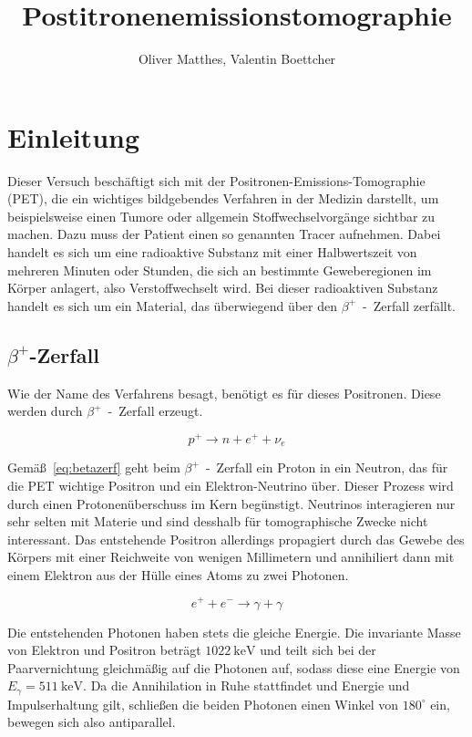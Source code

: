 \documentclass[slug=PET, room=Andreas-Schubert-Bau\,\ 424A,
supervisor=Carsten\ Bittrich, coursedate=10.\ 01.\ 2020, ngerman]{../../Lab_Report_LaTeX/lab_report}
\title{Postitronenemissionstomographie}
\author{Oliver Matthes, Valentin Boettcher}
\begin{document}
\maketitle

\section{Einleitung}
\label{sec:einl}

Dieser Versuch beschäftigt sich mit der
Positronen-Emissions-Tomographie (PET), die ein wichtiges bildgebendes
Verfahren in der Medizin darstellt, um beispielsweise einen Tumore
oder allgemein Stoffwechselvorgänge sichtbar zu machen.  Dazu muss der
Patient einen so genannten Tracer aufnehmen. Dabei handelt es sich um
eine radioaktive Substanz mit einer Halbwertszeit von mehreren Minuten
oder Stunden, die sich an bestimmte Geweberegionen im Körper anlagert,
also Verstoffwechselt wird. Bei dieser radioaktiven Substanz handelt
es sich um ein Material, das überwiegend über den
\(\beta^+\)~-~Zerfall zerfällt.

\subsection{\(\beta^+\)-Zerfall}
\label{sec:betazerf}

Wie der Name des Verfahrens besagt, benötigt es für dieses
Positronen. Diese werden durch \(\beta^+\)~-~Zerfall erzeugt.

\begin{equation}\label{eq:betazerf}
        p^+ \rightarrow n + e^+ + \nu_e
\end{equation}

Gem\"a\ss{}~\eqref{eq:betazerf} geht beim \(\beta^+\)~-~Zerfall ein
Proton in ein Neutron, das für die PET wichtige Positron und ein
Elektron-Neutrino \"uber. Dieser Prozess wird durch einen
Protonen\"uberschuss im Kern beg\"unstigt.  Neutrinos interagieren nur
sehr selten mit Materie und sind desshalb f\"ur tomographische Zwecke
nicht interessant. Das entstehende Positron allerdings propagiert
durch das Gewebe des Körpers mit einer Reichweite von wenigen
Millimetern und annihiliert dann mit einem Elektron aus der Hülle
eines Atoms zu zwei Photonen.

\begin{equation}\label{eq:annihi}
        e^+ + e^- \rightarrow \gamma + \gamma
\end{equation}

Die entstehenden Photonen haben stets die gleiche Energie. Die
invariante Masse von Elektron und Positron beträgt
\(\SI{1022}{\kilo\electronvolt}\) und teilt sich bei der
Paarvernichtung gleichmäßig auf die Photonen auf, sodass diese eine
Energie von \(E_\gamma = \SI{511}{\kilo\electronvolt}\).  Da die
Annihilation in Ruhe stattfindet und Energie und Impulserhaltung gilt,
schließen die beiden
Photonen einen Winkel von \(180^\circ\) ein, bewegen sich also antiparallel.\\
\end{document}
